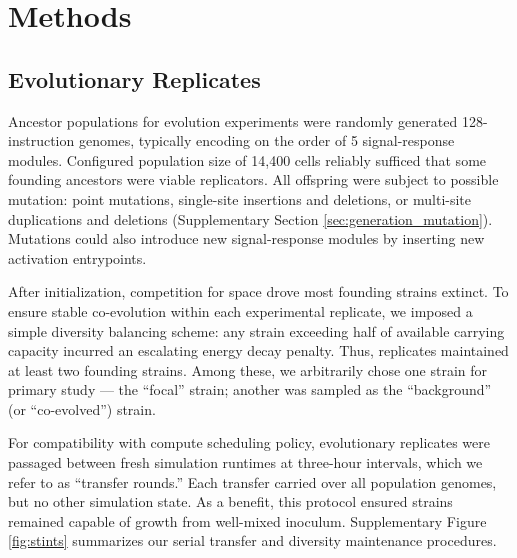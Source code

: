 



\section{Methods} \label{sec:methods}

\subsection{Evolutionary Replicates}

Ancestor populations for evolution experiments were randomly generated 128-instruction genomes, typically encoding on the order of 5 signal-response modules.
Configured population size of 14,400 cells reliably sufficed that some founding ancestors were viable replicators.
All offspring were subject to possible mutation: point mutations, single-site insertions and deletions, or multi-site duplications and deletions (Supplementary Section \ref{sec:generation_mutation}).
Mutations could also introduce new signal-response modules by inserting new activation entrypoints.

After initialization, competition for space drove most founding strains extinct.
To ensure stable co-evolution within each experimental replicate, we imposed a simple diversity balancing scheme: any strain exceeding half of available carrying capacity incurred an escalating energy decay penalty.
Thus, replicates maintained at least two founding strains.
Among these, we arbitrarily chose one strain for primary study --- the ``focal'' strain;
another was sampled as the ``background'' (or ``co-evolved'') strain.

For compatibility with compute scheduling policy, evolutionary replicates were passaged between fresh simulation runtimes at three-hour intervals, which we refer to as ``transfer rounds.''
Each transfer carried over all population genomes, but no other simulation state.
As a benefit, this protocol ensured strains remained capable of growth from well-mixed inoculum.
Supplementary Figure \ref{fig:stints} summarizes our serial transfer and diversity maintenance procedures.


